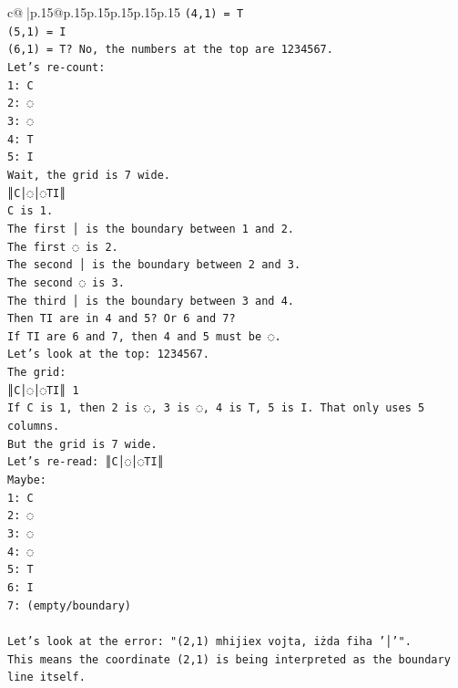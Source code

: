 \documentclass{article}
\begin{document}
{\begin{supertabular}{c@{$\;$}|p{.15\linewidth}@{}p{.15\linewidth}p{.15\linewidth}p{.15\linewidth}p{.15\linewidth}p{.15\linewidth}}
{{{\texttt{(4,1) = T} \\
\texttt{(5,1) = I} \\
\texttt{(6,1) = T? No, the numbers at the top are 1234567.} \\
\texttt{Let's re{-}count:} \\
\texttt{1: C} \\
\texttt{2: ◌} \\
\texttt{3: ◌} \\
\texttt{4: T} \\
\texttt{5: I} \\
\texttt{Wait, the grid is 7 wide.} \\
\texttt{║C│◌│◌TI║} \\
\texttt{C is 1.} \\
\texttt{The first │ is the boundary between 1 and 2.} \\
\texttt{The first ◌ is 2.} \\
\texttt{The second │ is the boundary between 2 and 3.} \\
\texttt{The second ◌ is 3.} \\
\texttt{The third │ is the boundary between 3 and 4.} \\
\texttt{Then TI are in 4 and 5? Or 6 and 7?} \\
\texttt{If TI are 6 and 7, then 4 and 5 must be ◌.} \\
\texttt{Let's look at the top:  1234567.} \\
\texttt{The grid:} \\
\texttt{║C│◌│◌TI║ 1} \\
\texttt{If C is 1, then 2 is ◌, 3 is ◌, 4 is T, 5 is I. That only uses 5 columns.} \\
\texttt{But the grid is 7 wide.} \\
\texttt{Let's re{-}read: ║C│◌│◌TI║} \\
\texttt{Maybe:} \\
\texttt{1: C} \\
\texttt{2: ◌} \\
\texttt{3: ◌} \\
\texttt{4: ◌} \\
\texttt{5: T} \\
\texttt{6: I} \\
\texttt{7: (empty/boundary)} \\
\\ 
\texttt{Let's look at the error: "(2,1) mhijiex vojta, iżda fiha '│'".} \\
\texttt{This means the coordinate (2,1) is being interpreted as the boundary line itself.} \\
}}}
\end{supertabular}}
\end{document}
